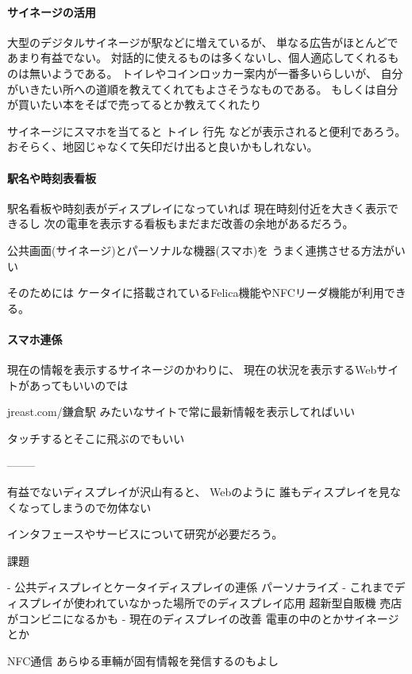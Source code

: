\documentclass[a4j,11pt,twocolumn]{jarticle}
\begin{document}
\paragraph{サイネージの活用}

大型のデジタルサイネージが駅などに増えているが、
単なる広告がほとんどであまり有益でない。
対話的に使えるものは多くないし、個人適応してくれるものは無いようである。
トイレやコインロッカー案内が一番多いらしいが、
自分がいきたい所への道順を教えてくれてもよさそうなものである。
もしくは自分が買いたい本をそばで売ってるとか教えてくれたり

サイネージにスマホを当てると
	トイレ
	行先
などが表示されると便利であろう。
おそらく、地図じゃなくて矢印だけ出ると良いかもしれない。

\paragraph{駅名や時刻表看板}

駅名看板や時刻表がディスプレイになっていれば
現在時刻付近を大きく表示できるし
次の電車を表示する看板もまだまだ改善の余地があるだろう。

公共画面(サイネージ)とパーソナルな機器(スマホ)を
うまく連携させる方法がいい

そのためには
ケータイに搭載されているFelica機能やNFCリーダ機能が利用できる。

\paragraph{スマホ連係}

現在の情報を表示するサイネージのかわりに、
現在の状況を表示するWebサイトがあってもいいのでは

jreast.com/鎌倉駅 みたいなサイトで常に最新情報を表示してればいい

タッチするとそこに飛ぶのでもいい


--------

有益でないディスプレイが沢山有ると、
Webのように
誰もディスプレイを見なくなってしまうので勿体ない


インタフェースやサービスについて研究が必要だろう。

課題

- 公共ディスプレイとケータイディスプレイの連係
  パーソナライズ
- これまでディスプレイが使われていなかった場所でのディスプレイ応用
  超新型自販機
  売店がコンビニになるかも
- 現在のディスプレイの改善
  電車の中のとかサイネージとか

NFC通信
あらゆる車輛が固有情報を発信するのもよし

\scriptsize


\end{document}
